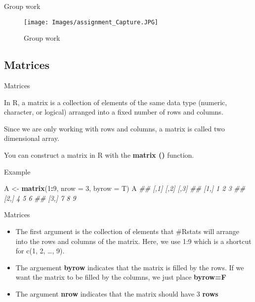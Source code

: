 \documentclass[
  ignorenonframetext,
]{beamer}
\newenvironment{Shaded}{\begin{snugshade}}{\end{snugshade}}
\newcommand{\CommentTok}[1]{\textcolor[rgb]{0.56,0.35,0.01}{\textit{#1}}}
\newcommand{\DataTypeTok}[1]{\textcolor[rgb]{0.13,0.29,0.53}{#1}}
\newcommand{\DecValTok}[1]{\textcolor[rgb]{0.00,0.00,0.81}{#1}}
\newcommand{\KeywordTok}[1]{\textcolor[rgb]{0.13,0.29,0.53}{\textbf{#1}}}
\newcommand{\NormalTok}[1]{#1}
\newcommand{\OperatorTok}[1]{\textcolor[rgb]{0.81,0.36,0.00}{\textbf{#1}}}
\newcommand{\StringTok}[1]{\textcolor[rgb]{0.31,0.60,0.02}{#1}}
\providecommand{\tightlist}{%
  \setlength{\itemsep}{0pt}\setlength{\parskip}{0pt}}
\begin{document}
\begin{frame}{Group work}
\protect\hypertarget{group-work}{}

\begin{figure}
\centering
\texttt{[image: Images/assignment\_Capture.JPG]}
\caption{Group work}
\end{figure}

\end{frame}


\subsection{Matrices}

\begin{frame}[fragile]{Matrices}
\protect\hypertarget{matrices}{}

In R, a matrix is a collection of elements of the same data type
(numeric, character, or logical) arranged into a fixed number of rows
and columns.

Since we are only working with rows and columns, a matrix is called two
dimensional array.

You can construct a matrix in R with the \textbf{matrix ()} function.

\begin{block}{Example}

\begin{Shaded}
\begin{Highlighting}[]
\NormalTok{A <-}\StringTok{ }\KeywordTok{matrix}\NormalTok{(}\DecValTok{1}\OperatorTok{:}\DecValTok{9}\NormalTok{, }\DataTypeTok{nrow =} \DecValTok{3}\NormalTok{, }\DataTypeTok{byrow =}\NormalTok{ T)}
\NormalTok{A}
\CommentTok{##      [,1] [,2] [,3]}
\CommentTok{## [1,]    1    2    3}
\CommentTok{## [2,]    4    5    6}
\CommentTok{## [3,]    7    8    9}
\end{Highlighting}
\end{Shaded}

\end{block}

\end{frame}

\begin{frame}{Matrices}
\protect\hypertarget{matrices-1}{}

\begin{itemize}
\tightlist
\item
  The first argument is the collection of elements that \#Rstats will
  arrange into the rows and columns of the matrix. Here, we use 1:9
  which is a shortcut for c(1, 2, \ldots, 9).
\item
  The arguement \textbf{byrow} indicates that the matrix is filled by
  the rows. If we want the matrix to be filled by the columns, we just
  place \textbf{byrow=F}
\item
  The argument \textbf{nrow} indicates that the matrix should have 3
  \textbf{rows}
\end{itemize}

\end{frame}
\end{document}

